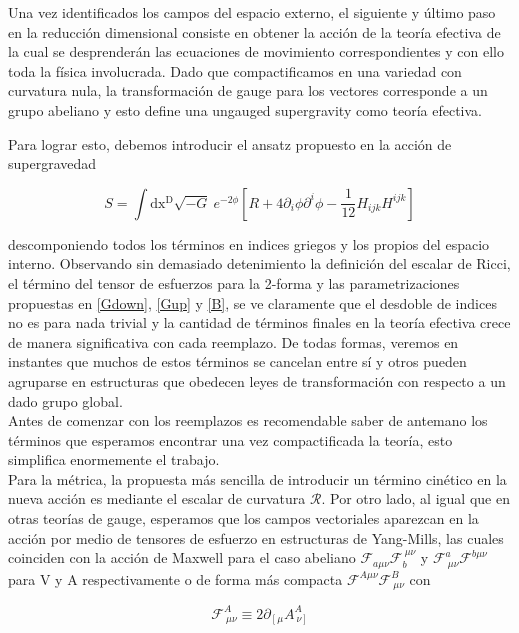 \documentclass{article}
\numberwithin{equation}{section}
\begin{document}
Una vez identificados los campos del espacio externo, el siguiente y último paso en la reducción dimensional consiste en obtener la acción de la teoría efectiva de la cual se desprenderán las ecuaciones de movimiento correspondientes y con ello toda la física involucrada. Dado que compactificamos en una variedad con curvatura nula, la transformación de gauge para los vectores corresponde a un grupo abeliano y esto define una ungauged supergravity como teoría efectiva. 

Para lograr esto, debemos introducir el ansatz propuesto en la acción de supergravedad

\begin{equation}\label{S}
S=\int\mathrm{dx^D} \sqrt{-G} \ e^{-2\phi}\left[R + 4 \partial_i\phi\partial^i \phi - \frac{1}{12} H_{i j k}H^{i j k}\right]  
\end{equation}

descomponiendo todos los términos en indices griegos y los propios del espacio interno. Observando sin demasiado detenimiento la definición del escalar de Ricci, el término del tensor de esfuerzos para la 2-forma y las parametrizaciones propuestas en \ref{Gdown}, \ref{Gup} y \ref{B}, se ve claramente que el desdoble de indices no es para nada trivial y la cantidad de términos finales en la teoría efectiva crece de manera significativa con cada reemplazo. De todas formas, veremos en instantes que muchos de estos términos se cancelan entre sí y otros pueden agruparse en estructuras que obedecen leyes de transformación con respecto a un dado grupo global.\\ 

Antes de comenzar con los reemplazos es recomendable saber de antemano los términos que esperamos encontrar una vez compactificada la teoría, esto simplifica enormemente el trabajo.\\


Para la métrica, la propuesta más sencilla de introducir un término cinético en la nueva acción es mediante el escalar de curvatura $ \mathcal{R} $. Por otro lado, al igual que en otras teorías de gauge, esperamos que los campos vectoriales aparezcan en la acción por medio de tensores de esfuerzo en estructuras de Yang-Mills, las cuales coinciden con la acción de Maxwell para el caso abeliano $ \mathcal{F}_{a \mu \nu} \mathcal{F}_b^{\ \mu \nu} $ y $ \mathcal{F}^a_{\ \mu \nu} \mathcal{F}^{b \mu \nu} $ para V y A respectivamente o de forma más compacta $ \mathcal{F}^{A \mu \nu} \mathcal{F}^B_{\ \mu \nu} $ con

\begin{equation}\label{F}
\mathcal{F}^A_{\ \mu \nu} \equiv 2 \partial_{\left[\mu\right.}A^A_{\ \left.\nu\right]}
\end{equation}
\end{document}
